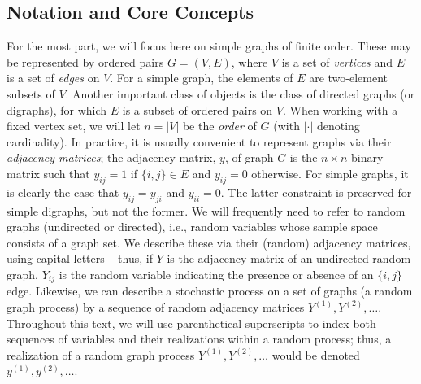 \documentclass[11pt]{article}
\begin{document}
\subsection{Notation and Core Concepts}

For the most part, we will focus here on simple graphs of finite order.  These may be represented by ordered pairs $G=(V,E)$, where $V$ is a set of \emph{vertices} and $E$ is a set of \emph{edges} on $V$.  For a simple graph, the elements of $E$ are two-element subsets of $V$.  Another important class of objects is the class of directed graphs (or digraphs), for which $E$ is a subset of ordered pairs on $V$.  When working with a fixed vertex set, we will let $n=|V|$ be the \emph{order} of $G$ (with $|\cdot|$ denoting cardinality).  In practice, it is usually convenient to represent graphs via their \emph{adjacency matrices}; the adjacency matrix, $y$, of graph $G$ is the $n \times n$ binary matrix such that $y_{ij}=1$ if $\{i,j\} \in E$ and $y_{ij}=0$ otherwise.  For simple graphs, it is clearly the case that $y_{ij}=y_{ji}$ and $y_{ii}=0$.  The latter constraint is preserved for simple digraphs, but not the former.  We will frequently need to refer to random graphs (undirected or directed), i.e., random variables whose sample space consists of a graph set.  We describe these via their (random) adjacency matrices, using capital letters -- thus, if $Y$ is the adjacency matrix of an undirected random graph, $Y_{ij}$ is the random variable indicating the presence or absence of an $\{i,j\}$ edge.  Likewise, we can describe a stochastic process on a set of graphs (a random graph process) by a sequence of random adjacency matrices $Y^{(1)},Y^{(2)},\ldots$.  Throughout this text, we will use parenthetical superscripts to index both sequences of variables and their realizations within a random process; thus, a realization of a random graph process $Y^{(1)},Y^{(2)},\ldots$ would be denoted $y^{(1)},y^{(2)},\ldots$.
\end{document}
